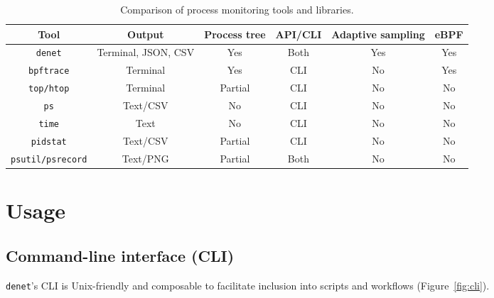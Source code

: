 \documentclass[10pt]{article}
\begin{document}
\begin{table}[ht]
  \centering
  \small
  \caption{Comparison of process monitoring tools and libraries.}
  \label{tab:tool_comparison}
  \begin{tabularx}{\linewidth}{c c c c c c} %
   \toprule
    Tool                    & Output              & Process tree  & API/CLI & Adaptive sampling &  eBPF     \\
    \midrule
    \texttt{denet}          & Terminal, JSON, CSV & Yes          & Both    & Yes                   & Yes      \\
    \texttt{bpftrace}\cite{bpftrace}       & Terminal            & Yes         & CLI      & No                    & Yes \\
    \texttt{top/htop}       & Terminal            & Partial      & CLI     & No                    & No                \\
    \texttt{ps}             & Text/CSV            & No           & CLI     & No                    & No                \\
    \texttt{time}           & Text                & No           & CLI     & No                    & No                \\
    \texttt{pidstat}        & Text/CSV            & Partial      & CLI     & No           & No                \\
    \texttt{psutil\cite{rodola2020psutil}/psrecord\cite{psrecord}}& Text/PNG  & Partial      & Both     & No          & No            \\
    \bottomrule
  \end{tabularx}
\end{table}

\vspace{-0.8cm}

\section*{Usage}

\subsection*{Command-line interface (CLI)}

\texttt{denet}'s CLI is Unix-friendly \cite{raymond1999cathedral} and composable to facilitate inclusion into scripts and workflows (Figure~\ref{fig:cli}).\\
\end{document}
